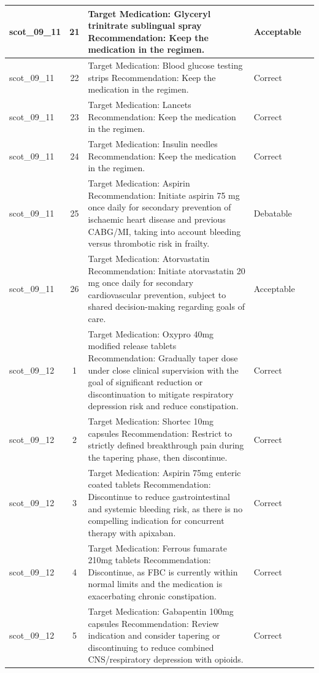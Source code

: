 \begin{longtable}{|p{1.45cm}|c|p{10.2cm}|p{1.55cm}|p{2.3cm}|}
\hline
scot\_09\_11 & 21 & Target Medication: Glyceryl trinitrate sublingual spray Recommendation: Keep the medication in the regimen. & Acceptable &  \\
\hline
scot\_09\_11 & 22 & Target Medication: Blood glucose testing strips Recommendation: Keep the medication in the regimen. & Correct &  \\
\hline
scot\_09\_11 & 23 & Target Medication: Lancets Recommendation: Keep the medication in the regimen. & Correct &  \\
\hline
scot\_09\_11 & 24 & Target Medication: Insulin needles Recommendation: Keep the medication in the regimen. & Correct &  \\
\hline
scot\_09\_11 & 25 & Target Medication: Aspirin Recommendation: Initiate aspirin 75 mg once daily for secondary prevention of ischaemic heart disease and previous CABG/MI, taking into account bleeding versus thrombotic risk in frailty. & Debatable &  \\
\hline
scot\_09\_11 & 26 & Target Medication: Atorvastatin Recommendation: Initiate atorvastatin 20 mg once daily for secondary cardiovascular prevention, subject to shared decision-making regarding goals of care. & Acceptable &  \\
\hline
scot\_09\_12 & 1 & Target Medication: Oxypro 40mg modified release tablets Recommendation: Gradually taper dose under close clinical supervision with the goal of significant reduction or discontinuation to mitigate respiratory depression risk and reduce constipation. & Correct &  \\
\hline
scot\_09\_12 & 2 & Target Medication: Shortec 10mg capsules Recommendation: Restrict to strictly defined breakthrough pain during the tapering phase, then discontinue. & Correct &  \\
\hline
scot\_09\_12 & 3 & Target Medication: Aspirin 75mg enteric coated tablets Recommendation: Discontinue to reduce gastrointestinal and systemic bleeding risk, as there is no compelling indication for concurrent therapy with apixaban. & Correct &  \\
\hline
scot\_09\_12 & 4 & Target Medication: Ferrous fumarate 210mg tablets Recommendation: Discontinue, as FBC is currently within normal limits and the medication is exacerbating chronic constipation. & Correct &  \\
\hline
scot\_09\_12 & 5 & Target Medication: Gabapentin 100mg capsules Recommendation: Review indication and consider tapering or discontinuing to reduce combined CNS/respiratory depression with opioids. & Correct &  \\

\end{longtable}
